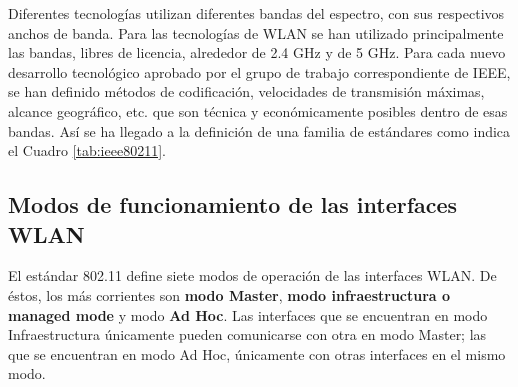 Diferentes tecnologías utilizan diferentes bandas del espectro, con sus respectivos anchos de banda. Para las tecnologías de WLAN se han utilizado principalmente las bandas, libres de licencia, alrededor de 2.4 GHz y de 5 GHz. Para cada nuevo desarrollo tecnológico aprobado por el grupo de trabajo correspondiente de IEEE, se han definido métodos de codificación, velocidades de transmisión máximas, alcance geográfico, etc. que son técnica y económicamente posibles dentro de esas bandas.  Así se ha llegado a la definición de una familia de estándares como indica el Cuadro \ref{tab:ieee80211}.
 
 





\subsection{Modos de funcionamiento de las interfaces WLAN}
El estándar 802.11 define siete modos de operación de las interfaces WLAN. De éstos, los más corrientes son \textbf{modo Master}, \textbf{modo infraestructura o managed mode} y modo \textbf{Ad Hoc}. Las interfaces que se encuentran en modo Infraestructura únicamente pueden comunicarse con otra en modo Master; las que se encuentran en modo Ad Hoc, únicamente con otras interfaces en el mismo modo.

